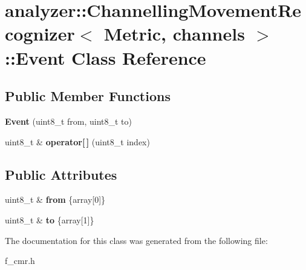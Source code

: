 \hypertarget{classanalyzer_1_1_channelling_movement_recognizer_1_1_event}{}\section{analyzer\+::Channelling\+Movement\+Recognizer$<$ Metric, channels $>$\+::Event Class Reference}
\label{classanalyzer_1_1_channelling_movement_recognizer_1_1_event}
\subsection*{Public Member Functions}
\begin{DoxyCompactItemize}
\item 
\mbox{\label{classanalyzer_1_1_channelling_movement_recognizer_1_1_event_ae5bc2f32efb03930fdd380f0067b2e67}} 
{\bfseries Event} (uint8\+\_\+t from, uint8\+\_\+t to)
\item 
\mbox{\label{classanalyzer_1_1_channelling_movement_recognizer_1_1_event_aad8af28eda88389bef76c7e301608923}} 
uint8\+\_\+t \& {\bfseries operator\mbox{[}$\,$\mbox{]}} (uint8\+\_\+t index)
\end{DoxyCompactItemize}
\subsection*{Public Attributes}
\begin{DoxyCompactItemize}
\item 
\mbox{\label{classanalyzer_1_1_channelling_movement_recognizer_1_1_event_a0ac86542c402b130ae6f8ed994b15275}} 
uint8\+\_\+t \& {\bfseries from} \{array\mbox{[}0\mbox{]}\}
\item 
\mbox{\label{classanalyzer_1_1_channelling_movement_recognizer_1_1_event_a5bf9d04c436fcd28c54f8f5c7b3a7571}} 
uint8\+\_\+t \& {\bfseries to} \{array\mbox{[}1\mbox{]}\}
\end{DoxyCompactItemize}


The documentation for this class was generated from the following file\+:\begin{DoxyCompactItemize}
\item 
f\+\_\+cmr.\+h\end{DoxyCompactItemize}
